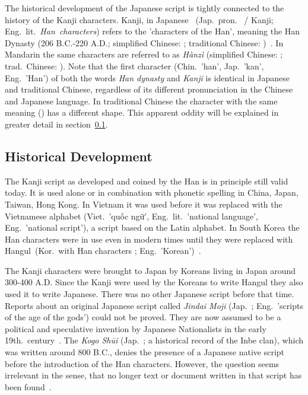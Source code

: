 The historical development of the Japanese script is tightly connected to the 
history of the Kanji characters. Kanji, in Japanese 
~(Jap.\ pron.\  / Kanji; Eng.\ lit.\ \emph{Han~characters}) 
refers to the 'characters of the Han', meaning the Han Dynasty 
(206 B.C.-220 A.D.; simplified Chinese: ; traditional Chinese: 
)~. In Mandarin the same characters are 
referred to as \emph{Hànzì} (simplified Chinese: ; 
trad.\ Chinese: ).
Note that the first character  (Chin.\ 'han', Jap.\ 'kan', Eng.\ 'Han') 
of both the words \emph{Han dynasty} and \emph{Kanji} is identical in Japanese 
and traditional Chinese, regardless of its different pronunciation in the 
Chinese and Japanese language. In traditional Chinese the character with
the same meaning () has a different shape. This apparent oddity will be 
explained in greater detail in 
section~\ref{sec:historicaldevelopmentofjapanesescript}.

\subsection{Historical Development}
\label{sec:historicaldevelopmentofjapanesescript}

The Kanji script as developed and coined by the Han is in principle still valid 
today. It is used alone or in combination with phonetic spelling in China, Japan,
Taiwan, Hong Kong. In Vietnam it was used before it was replaced with the 
Vietnamese alphabet (Viet.\ 'quốc ngữ', Eng.\ lit.\ 'national language',
Eng.\ 'national script'), a script based on the Latin alphabet. In South Korea 
the Han characters were in use even in modern times until they were 
replaced with 
Hangul~(Kor.\ with Han characters 
; Eng.\ 'Korean')~.

The Kanji characters were brought to Japan by Koreans living in Japan around 
300-400 A.D. Since the Kanji were used by the Koreans to write 
Hangul they also used it to write Japanese. There was no other Japanese script 
before that time. Reports about an original Japanese script called 
\emph{Jindai Moji} (Jap.\ ; Eng.\ 'scripts of the age of the gods')
could not be proved. They are now assumed to be a political and speculative 
invention by Japanese Nationalists in the early 
19th.\ century~. The \emph{Kogo Shūi} 
(Jap.\ ; a historical record of the Inbe clan),
which was written around 800 B.C., denies the presence of a Japanese native
script before the introduction of the Han characters. However, the question
seems irrelevant in the sense, that no longer text or document written in 
that script has been found~.

